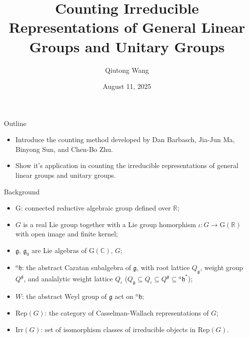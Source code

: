 \documentclass{beamer}
\title[]{Counting Irreducible Representations of General Linear Groups and Unitary Groups}
\author{Qiutong Wang}
\institute{Zhejiang University}
\date{August 11, 2025}
\newcommand{\BC}{{\mathbb {C}}}
\newcommand{\BR}{{\mathbb {R}}}
\newcommand{\RG}{{\mathrm {G}}}
\newcommand{\fg}{\mathfrak{g}}
\newcommand{\fh}{\mathfrak{h}}
\begin{document}
\begin{frame}
  \titlepage
\end{frame}




\begin{frame}{Outline}

\begin{itemize}
  \item Introduce the counting method developed by Dan Barbasch, Jia-Jun Ma, Binyong Sun, and Chen-Bo Zhu.
  \item Show it's application in counting the irreducible representations of general linear groups and unitary groups.
\end{itemize}
\end{frame}












\begin{frame}{Background}
  \begin{itemize}
    \item $\RG$: connected reductive algebraic group defined over $\BR$;
    \item $G$ is a real Lie group together with a Lie group homorphism $\iota: G \to \RG(\BR)$ with open image and finite kernel;
    \item $\fg$, $\fg_0$ are Lie algebras of $\RG(\BC)$, $G$;
    \item $^{a}\fh$: the abstract Caratan subalgebra of $\fg$, with root lattice $Q_{\fg}$, weight group $Q^{\fg}$, and analalytic weight lattice $Q_{\iota}$ ($Q_{\fg} \subseteq Q_{\iota} \subseteq Q^{\fg} \subseteq {^{a}\fh}^*$);
    \item $W$: the abstract Weyl group of $\fg$ act on $^{a}\fh$;
    \item $\mathrm{Rep}(G)$: the category of Casselman-Wallach representations of $G$;
    \item $\mathrm{Irr}(G)$: set of isomorphism classes of irreducible objects in $\mathrm{Rep}(G)$.
  \end{itemize}
  




\end{frame}
\end{document}
